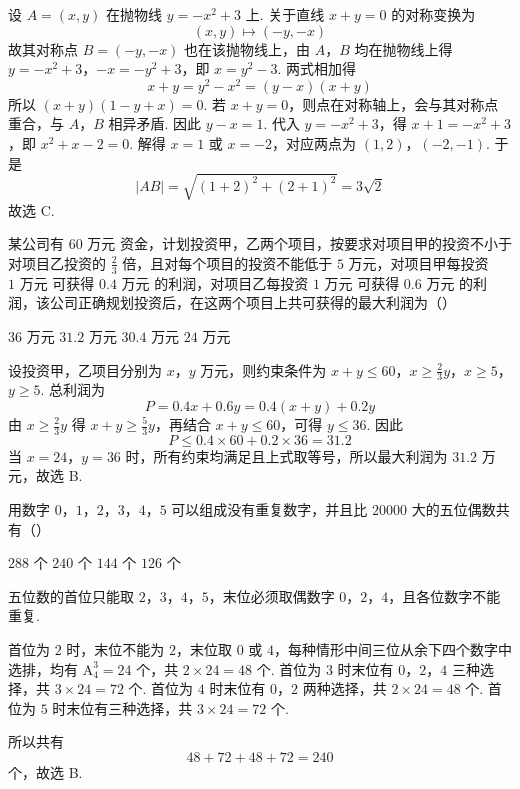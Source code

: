 
\begin{solution}
设 \(A=(x,y)\) 在抛物线 \(y=-x^2+3\) 上. 关于直线 \(x+y=0\) 的对称变换为
\[
(x,y)\longmapsto(-y,-x)
\]
故其对称点 \(B=(-y,-x)\) 也在该抛物线上，由 \(A\)，\(B\) 均在抛物线上得 \(y=-x^2+3\)，\(-x=-y^2+3\)，即 \(x=y^2-3\). 两式相加得
\[
x+y=y^2-x^2=(y-x)(x+y)
\]
所以 \((x+y)(1-y+x)=0\). 若 \(x+y=0\)，则点在对称轴上，会与其对称点重合，与 \(A\)，\(B\) 相异矛盾. 因此 \(y-x=1\).
代入 \(y=-x^2+3\)，得 \(x+1=-x^2+3\)，即 \(x^2+x-2=0\).
解得 \(x=1\) 或 \(x=-2\)，对应两点为 \((1,2)\)，\((-2,-1)\). 于是
\[
|AB|=\sqrt{(1+2)^2+(2+1)^2}=3\sqrt2
\]
故选 C.
\end{solution}

\begin{problem}
某公司有 \(60\text{ 万元}\) 资金，计划投资甲，乙两个项目，按要求对项目甲的投资不小于对项目乙投资的 \(\frac{2}{3}\) 倍，且对每个项目的投资不能低于 \(5\text{ 万元}\)，对项目甲每投资 \(1\text{ 万元}\) 可获得 \(0.4\text{ 万元}\) 的利润，对项目乙每投资 \(1\text{ 万元}\) 可获得 \(0.6\text{ 万元}\) 的利润，该公司正确规划投资后，在这两个项目上共可获得的最大利润为（\quad）

\choices
    {\(36\text{ 万元}\)}
    {\(31.2\text{ 万元}\)}
    {\(30.4\text{ 万元}\)}
    {\(24\text{ 万元}\)}
\end{problem}


\begin{solution}
设投资甲，乙项目分别为 \(x\)，\(y\) 万元，则约束条件为 \(x+y\leq60\)，\(x\geq\frac23y\)，\(x\geq5\)，\(y\geq5\).
总利润为
\[
P=0.4x+0.6y=0.4(x+y)+0.2y
\]
由 \(x\geq\frac23y\) 得 \(x+y\geq\frac53y\)，再结合 \(x+y\leq60\)，可得 \(y\leq36\). 因此
\[
P\leq0.4\times60+0.2\times36=31.2
\]
当 \(x=24\)，\(y=36\) 时，所有约束均满足且上式取等号，所以最大利润为 \(31.2\) 万元，故选 B.
\end{solution}

\begin{problem}
用数字 \(0\)，\(1\)，\(2\)，\(3\)，\(4\)，\(5\) 可以组成没有重复数字，并且比 \(20000\) 大的五位偶数共有（\quad）

\choices
    {\(288\text{ 个}\)}
    {\(240\text{ 个}\)}
    {\(144\text{ 个}\)}
    {\(126\text{ 个}\)}
\end{problem}


\begin{solution}
五位数的首位只能取 \(2\)，\(3\)，\(4\)，\(5\)，末位必须取偶数字 \(0\)，\(2\)，\(4\)，且各位数字不能重复.

首位为 \(2\) 时，末位不能为 \(2\)，末位取 \(0\) 或 \(4\)，每种情形中间三位从余下四个数字中选排，均有 \(\mathrm A_4^3=24\) 个，共 \(2\times24=48\) 个. 首位为 \(3\) 时末位有 \(0\)，\(2\)，\(4\) 三种选择，共 \(3\times24=72\) 个. 首位为 \(4\) 时末位有 \(0\)，\(2\) 两种选择，共 \(2\times24=48\) 个. 首位为 \(5\) 时末位有三种选择，共 \(3\times24=72\) 个.

所以共有
\[
48+72+48+72=240
\]
个，故选 B.
\end{solution}

